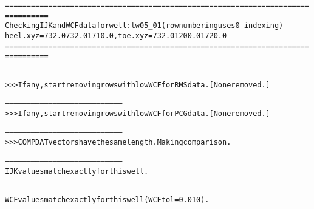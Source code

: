 \begin{alltt}
================================================================================
Checking IJK and WCF data for well: tw05_01 (row numbering uses 0-indexing)
heel.xyz = 732.0 732.0 1710.0, toe.xyz = 732.0 1200.0 1720.0
================================================================================

--------------------------------------------------------------------------------
>>> If any, start removing rows with low WCF for RMS data. [None removed.]

--------------------------------------------------------------------------------
>>> If any, start removing rows with low WCF for PCG data. [None removed.]

--------------------------------------------------------------------------------
>>> COMPDAT vectors have the same length. Making comparison.

--------------------------------------------------------------------------------
IJK values match exactly for this well.

--------------------------------------------------------------------------------
WCF values match exactly for this well (WCF tol = 0.010).
\end{alltt}

